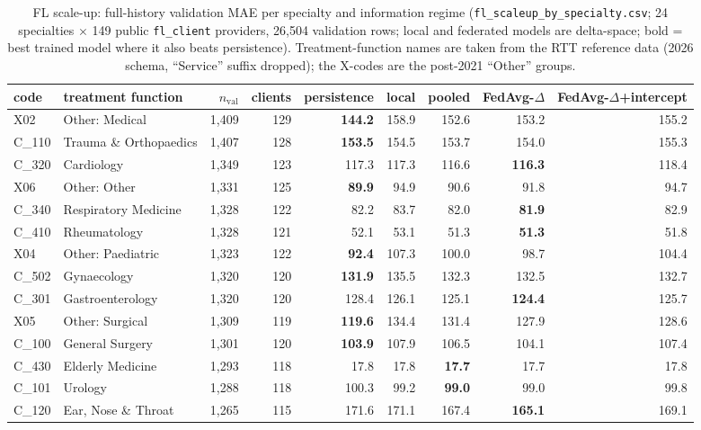 \documentclass[conference]{IEEEtran}
\begin{document}
\begin{table}[t]
\caption{FL scale-up: full-history validation MAE per specialty and information regime
(\texttt{fl\_scaleup\_by\_specialty.csv}; 24 specialties $\times$ 149 public \texttt{fl\_client}
providers, 26{,}504 validation rows; local and federated models are delta-space; bold = best
trained model where it also beats persistence). Treatment-function names are taken from the RTT
reference data (2026 schema, ``Service'' suffix dropped); the X-codes are the post-2021 ``Other''
groups.}
\label{tab:scaleup}
\centering
\footnotesize
\begin{tabular}{llrrrrrrr}
\toprule
code & treatment function & $n_{\mathrm{val}}$ & clients & persistence & local & pooled & FedAvg-$\Delta$ & FedAvg-$\Delta$+intercept \\
\midrule
X02 & Other: Medical & 1{,}409 & 129 & \textbf{144.2} & 158.9 & 152.6 & 153.2 & 155.2 \\
C\_110 & Trauma \& Orthopaedics & 1{,}407 & 128 & \textbf{153.5} & 154.5 & 153.7 & 154.0 & 155.3 \\
C\_320 & Cardiology & 1{,}349 & 123 & 117.3 & 117.3 & 116.6 & \textbf{116.3} & 118.4 \\
X06 & Other: Other & 1{,}331 & 125 & \textbf{89.9} & 94.9 & 90.6 & 91.8 & 94.7 \\
C\_340 & Respiratory Medicine & 1{,}328 & 122 & 82.2 & 83.7 & 82.0 & \textbf{81.9} & 82.9 \\
C\_410 & Rheumatology & 1{,}328 & 121 & 52.1 & 53.1 & 51.3 & \textbf{51.3} & 51.8 \\
X04 & Other: Paediatric & 1{,}323 & 122 & \textbf{92.4} & 107.3 & 100.0 & 98.7 & 104.4 \\
C\_502 & Gynaecology & 1{,}320 & 120 & \textbf{131.9} & 135.5 & 132.3 & 132.5 & 132.7 \\
C\_301 & Gastroenterology & 1{,}320 & 120 & 128.4 & 126.1 & 125.1 & \textbf{124.4} & 125.7 \\
X05 & Other: Surgical & 1{,}309 & 119 & \textbf{119.6} & 134.4 & 131.4 & 127.9 & 128.6 \\
C\_100 & General Surgery & 1{,}301 & 120 & \textbf{103.9} & 107.9 & 106.5 & 104.1 & 107.4 \\
C\_430 & Elderly Medicine & 1{,}293 & 118 & 17.8 & 17.8 & \textbf{17.7} & 17.7 & 17.8 \\
C\_101 & Urology & 1{,}288 & 118 & 100.3 & 99.2 & \textbf{99.0} & 99.0 & 99.8 \\
C\_120 & Ear, Nose \& Throat & 1{,}265 & 115 & 171.6 & 171.1 & 167.4 & \textbf{165.1} & 169.1 \\

\end{tabular}
\end{table}
\end{document}

